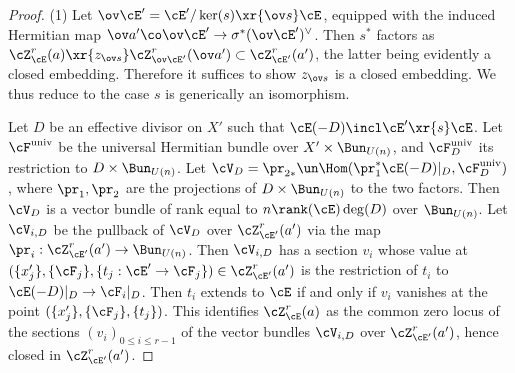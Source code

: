 \begin{proof}
(1) Let $\ov\cE'=\cE'/\ker(s)\xr{\ov s}\cE$, equipped with the induced Hermitian map $\ov a' \co \ov\cE' \rightarrow \sigma^* (\ov\cE')^{\vee}$. Then $s^{*}$ factors as $\cZ^{r}_{\cE}(a)\xr{z_{\ov s}}\cZ_{\ov\cE'}^{r}(\ov a')\subset \cZ^{r}_{\cE'}(a')$, the latter being evidently a closed embedding. Therefore it suffices to show $z_{\ov s}$ is a closed embedding. We thus reduce to the case $s$ is generically an isomorphism.

Let $D$ be an effective divisor on $X'$ such that $\cE(-D)\incl \cE'\xr{s}\cE$. Let $\cF^{\rm univ}$ be the universal Hermitian bundle over $X'\times \Bun_{U(n)}$, and $\cF^{\rm univ}_{D}$ its restriction to $D\times \Bun_{U(n)}$. Let $\cV_{D}=\pr_{2*}\un\Hom(\pr_{1}^{*}\cE(-D)|_{D},\cF^{\rm univ}_{D})$, where $\pr_{1},\pr_{2}$ are the projections of $D\times \Bun_{U(n)}$ to the two factors. Then $\cV_{D}$ is a vector  bundle of rank equal to $n\rank(\cE)\deg(D)$ over $\Bun_{U(n)}$. Let $\cV_{i,D}$ be the pullback of $\cV_{D}$ over $\cZ^{r}_{\cE'}(a')$ via the map $\pr_{i}: \cZ^{r}_{\cE'}(a')\to \Bun_{U(n)}$. Then $\cV_{i,D}$ has a section $v_{i}$ whose value at $(\{x'_{j}\}, \{\cF_{j}\}, \{t_{j}: \cE'\to \cF_{j}\})\in \cZ^{r}_{\cE'}(a')$ is the restriction of $t_{i}$ to $\cE(-D)|_{D}\to \cF_{i}|_{D}$.  Then $t_{i}$ extends to $\cE$ if and only if $v_{i}$ vanishes at the point $(\{x'_{j}\}, \{\cF_{j}\}, \{t_{j}\})$. This identifies $\cZ^{r}_{\cE}(a)$ as the common zero locus of the sections $(v_{i})_{0\le i\le r-1}$ of the vector bundles $\cV_{i,D}$ over $\cZ^{r}_{\cE'}(a')$, hence closed in $\cZ^{r}_{\cE'}(a')$.


\end{proof}
